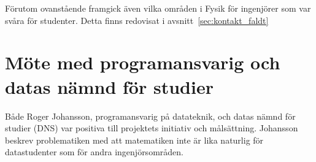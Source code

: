 Förutom ovanstående framgick även vilka områden i Fysik för ingenjörer som var
svåra för studenter. Detta finns redovisat i avsnitt~\ref{sec:kontakt_faldt}

\section{Möte med programansvarig och datas nämnd för studier}

Både Roger Johansson, programansvarig på datateknik, och datas nämnd för studier (DNS)
var positiva till projektets initiativ och målsättning. Johansson beskrev
problematiken med att matematiken inte är lika naturlig för datastudenter som för
andra ingenjörsområden.
